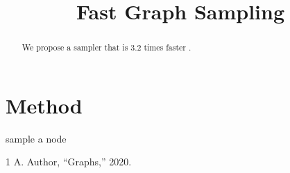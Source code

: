 \documentclass[conference]{IEEEtran}
\begin{document}
\title{Fast Graph Sampling}
\author{}
\maketitle

\begin{abstract}
We propose a sampler that is 3.2 times faster \cite{ref1}.
\end{abstract}

\section{Method}
\begin{algorithm}
\caption{Sampler}
\begin{algorithmic}
\STATE sample a node
\end{algorithmic}
\end{algorithm}

\begin{thebibliography}{1}
 A. Author, ``Graphs,'' 2020.
\end{thebibliography}
\end{document}
